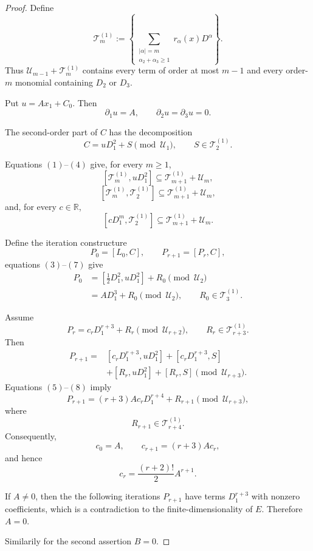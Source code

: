 \documentclass[11pt,a4paper]{article}
\numberwithin{equation}{section}
\theoremstyle{journalplain}
\theoremstyle{journaldef}
\begin{document}
\begin{tcolorbox}[
  enhanced,
  breakable,
  title={Proof of the pure-head Lie-growth lemma}
]
\begin{proof}
Define
\[
\mathcal T_m^{(1)}
:=
\left\{
\sum_{\substack{|\alpha|=m\\
\alpha_2+\alpha_3\ge1}}
r_\alpha(x)D^\alpha
\right\}.
\tag{2}
\]
Thus
\(
\mathcal U_{m-1}+\mathcal T_m^{(1)}
\)
contains every term of order at most \(m-1\) and every order-\(m\)
monomial containing \(D_2\) or \(D_3\).

Put
\(
u=Ax_1+C_0.
\)
Then
\[
\partial_1u=A,
\qquad
\partial_2u=\partial_3u=0.
\tag{3}
\]

The second-order part of \(C\) has the decomposition
\[
C=uD_1^2+S
\pmod{\mathcal U_1},
\qquad
S\in\mathcal T_2^{(1)}.
\tag{4}
\]

Equations \((1)\)--\((4)\) give, for every \(m\ge1\),
\[
[\mathcal T_m^{(1)},uD_1^2]
\subseteq
\mathcal T_{m+1}^{(1)}+\mathcal U_m,
\tag{5}
\]
\[
[\mathcal T_m^{(1)},\mathcal T_2^{(1)}]
\subseteq
\mathcal T_{m+1}^{(1)}+\mathcal U_m,
\tag{6}
\]
and, for every \(c\in\mathbb R\),
\[
[cD_1^m,\mathcal T_2^{(1)}]
\subseteq
\mathcal T_{m+1}^{(1)}+\mathcal U_m.
\tag{7}
\]

Define the iteration constructure
\[
P_0=[L_0,C],
\qquad
P_{r+1}=[P_r,C],
\tag{9}
\]
equations \((3)\)--\((7)\) give
\[
\begin{aligned}
P_0
&=
\left[\frac12D_1^2,uD_1^2\right]
+R_0
\pmod{\mathcal U_2}\\
&=
A D_1^3+R_0
\pmod{\mathcal U_2},
\qquad
R_0\in\mathcal T_3^{(1)}.
\end{aligned}
\tag{11}
\]

Assume
\[
P_r
=
c_rD_1^{r+3}+R_r
\pmod{\mathcal U_{r+2}},
\qquad
R_r\in\mathcal T_{r+3}^{(1)}.
\tag{12}
\]
Then
\[
\begin{aligned}
P_{r+1}
={}&
[c_rD_1^{r+3},uD_1^2]
+[c_rD_1^{r+3},S]\\
&+[R_r,uD_1^2]
+[R_r,S]
\pmod{\mathcal U_{r+3}}.
\end{aligned}
\tag{13}
\]
Equations \((5)\)--\((8)\) imply
\[
P_{r+1}
=
(r+3)Ac_rD_1^{r+4}
+R_{r+1}
\pmod{\mathcal U_{r+3}},
\tag{14}
\]
where
\[
R_{r+1}\in\mathcal T_{r+4}^{(1)}.
\tag{15}
\]
Consequently,
\[
c_0=A,
\qquad
c_{r+1}=(r+3)Ac_r,
\tag{16}
\]
and hence
\[
c_r
=
\frac{(r+2)!}{2}A^{r+1}.
\tag{17}
\]

If \(A\ne0\), then the the following iterations $P_{r+1}$ have terms $D_1^{r+3}$ with nonzero coefficients, which is a contradiction to the finite-dimensionality of $E$. Therefore
\(
A=0.
\)

Similarily for the second assertion $B = 0$.
\end{proof}
\end{tcolorbox}
\end{document}
